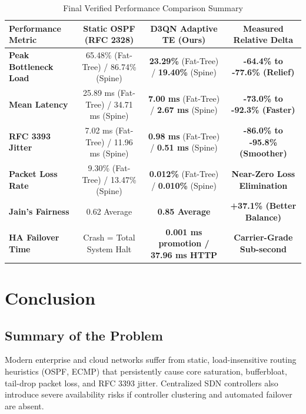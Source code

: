 \documentclass[12pt,a4paper,oneside]{report}
\begin{document}
\begin{table}[htbp]
\centering
\caption{Final Verified Performance Comparison Summary}
\label{tab:overall_comparison}
\small
\begin{tabularx}{\textwidth}{l c c c}
\toprule
\textbf{Performance Metric} & \textbf{Static OSPF (RFC 2328)} & \textbf{D3QN Adaptive TE (Ours)} & \textbf{Measured Relative Delta} \\
\midrule
\textbf{Peak Bottleneck Load} & 65.48\% (Fat-Tree) / 86.74\% (Spine) & \textbf{23.29\%} (Fat-Tree) / \textbf{19.40\%} (Spine) & \textbf{-64.4\% to -77.6\% (Relief)} \\
\textbf{Mean Latency} & 25.89 ms (Fat-Tree) / 34.71 ms (Spine) & \textbf{7.00 ms} (Fat-Tree) / \textbf{2.67 ms} (Spine) & \textbf{-73.0\% to -92.3\% (Faster)} \\
\textbf{RFC 3393 Jitter} & 7.02 ms (Fat-Tree) / 11.96 ms (Spine) & \textbf{0.98 ms} (Fat-Tree) / \textbf{0.51 ms} (Spine) & \textbf{-86.0\% to -95.8\% (Smoother)} \\
\textbf{Packet Loss Rate} & 9.30\% (Fat-Tree) / 13.47\% (Spine) & \textbf{0.012\%} (Fat-Tree) / \textbf{0.010\%} (Spine) & \textbf{Near-Zero Loss Elimination} \\
\textbf{Jain's Fairness} & 0.62 Average & \textbf{0.85 Average} & \textbf{+37.1\% (Better Balance)} \\
\textbf{HA Failover Time} & Crash = Total System Halt & \textbf{0.001 ms promotion / 37.96 ms HTTP} & \textbf{Carrier-Grade Sub-second} \\
\bottomrule
\end{tabularx}
\end{table}

\clearpage

\chapter{Conclusion}
\label{chap:conclusion}

\section{Summary of the Problem}
Modern enterprise and cloud networks suffer from static, load-insensitive routing heuristics (OSPF, ECMP) that persistently cause core saturation, bufferbloat, tail-drop packet loss, and RFC 3393 jitter. Centralized SDN controllers also introduce severe availability risks if controller clustering and automated failover are absent.
\end{document}
